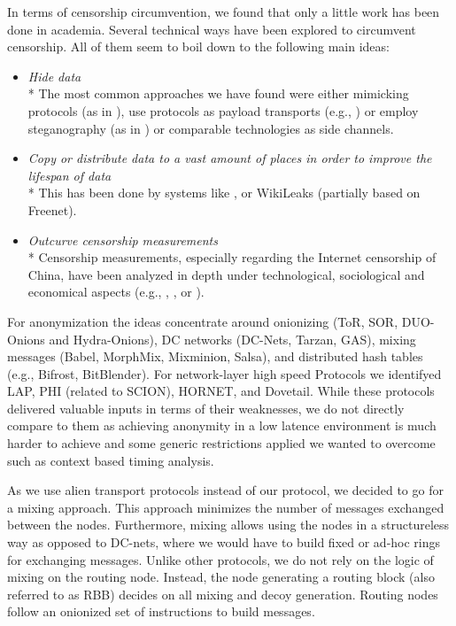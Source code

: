 \documentclass[acmsmall, screen, final, natbib=false]{acmart}
\begin{document}
	In terms of censorship circumvention, we found that only a little work has been done in academia. Several technical ways have been explored to circumvent censorship. All of them seem to boil down to the following main ideas:
	\begin{itemize}
		\item \emph{Hide data}\\*
		The most common approaches we have found were either mimicking protocols (as in \cite{mohajeri2013skypemorph}), use protocols as payload transports (e.g., \cite{AthanRAM07}) or employ steganography (as in \cite{f5}) or comparable technologies as side channels.
		\item \emph{Copy or distribute data to a vast amount of places in order to improve the lifespan of data}\\*
		This has been done by systems like \cite{freenet}, or WikiLeaks (partially based on Freenet).
		\item \emph{Outcurve censorship measurements}\\*
		Censorship measurements, especially regarding the Internet censorship of China, have been analyzed in depth under technological, sociological and economical aspects (e.g., \cite{Ensafi:2015}, \cite{Clayton:2006}, or \cite{lowe2007great}).
	\end{itemize}
	
	For anonymization the ideas concentrate around onionizing (ToR\cite{tor-spec}, SOR\cite{Egners_2012}, DUO-Onions and Hydra-Onions\cite{iwanik2005duo}), DC networks (DC-Nets\cite{chaum-dc}, Tarzan\cite{tarzan:ccs02}, GAS\cite{AthanRAM07}), mixing messages (Ba\-bel\cite{babel}, Morph\-Mix\cite{morphmix:wpes2002}, Mixminion\cite{minion-design}, Salsa\cite{Salsa}), and distributed hash tables (e.g., Bi\-frost\cite{Kondo2009}, Bit\-Blen\-der\cite{Bauer:2008}). For network-layer high speed Protocols we identifyed LAP\cite{hsiao2012lap}, PHI (related to SCI\-ON\cite{perrig2017scion}), HOR\-NET\cite{chen2015hornet}, and Dovetail\cite{chen2015hornet}. While these protocols delivered valuable inputs in terms of their weaknesses, we do not directly compare to them as achieving anonymity in a low latence environment is much harder to achieve and some generic restrictions applied we wanted to overcome such as context based timing analysis.
	
	As we use alien transport protocols instead of our protocol, we decided to go for a mixing approach. This approach minimizes the number of messages exchanged between the nodes. Furthermore, mixing allows using the nodes in a structureless way as opposed to DC-nets, where we would have to build fixed or ad-hoc rings for exchanging messages. Unlike other protocols, we do not rely on the logic of mixing on the routing node. Instead, the node generating a routing block (also referred to as RBB) decides on all mixing and decoy generation. Routing nodes follow an onionized set of instructions to build messages. 
	
\end{document}
